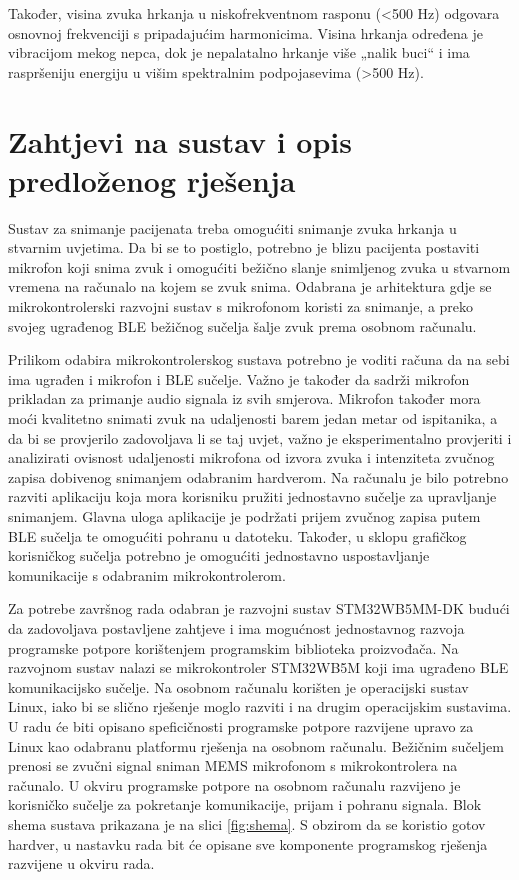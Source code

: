 Također, visina zvuka hrkanja u niskofrekventnom rasponu (<500 Hz) odgovara osnovnoj frekvenciji s pripadajućim harmonicima. Visina hrkanja određena je vibracijom mekog nepca, dok je nepalatalno hrkanje više „nalik buci“ i ima raspršeniju energiju u višim spektralnim podpojasevima (>500 Hz).


\section{Zahtjevi na sustav i opis predloženog rješenja}

Sustav za snimanje pacijenata treba omogućiti snimanje zvuka hrkanja u stvarnim uvjetima. Da bi se to postiglo, potrebno je blizu pacijenta postaviti mikrofon koji snima zvuk i omogućiti bežično slanje snimljenog zvuka u stvarnom vremena na računalo na kojem se zvuk snima. Odabrana je arhitektura gdje se mikrokontrolerski razvojni sustav s mikrofonom koristi za snimanje, a preko svojeg ugrađenog BLE bežičnog sučelja šalje zvuk prema osobnom računalu. 

Prilikom odabira mikrokontrolerskog sustava potrebno je voditi računa da na sebi ima ugrađen i mikrofon i BLE sučelje. Važno je također da sadrži mikrofon prikladan za primanje audio signala iz svih smjerova. Mikrofon također mora moći kvalitetno snimati  zvuk na udaljenosti barem jedan metar od ispitanika, a da bi se provjerilo zadovoljava li se taj uvjet, važno je eksperimentalno provjeriti i analizirati ovisnost udaljenosti mikrofona od izvora zvuka i intenziteta zvučnog zapisa dobivenog snimanjem odabranim hardverom. Na računalu je bilo potrebno razviti aplikaciju koja mora korisniku pružiti jednostavno sučelje za upravljanje snimanjem. Glavna uloga aplikacije je podržati prijem zvučnog zapisa putem BLE sučelja te omogućiti pohranu u datoteku. Također, u sklopu grafičkog korisničkog sučelja potrebno je omogućiti jednostavno uspostavljanje komunikacije s odabranim mikrokontrolerom.

Za potrebe završnog rada odabran je razvojni sustav STM32WB5MM-DK budući da zadovoljava postavljene zahtjeve i ima mogućnost jednostavnog razvoja programske potpore  korištenjem programskim biblioteka proizvođača. Na razvojnom sustav nalazi se mikrokontroler STM32WB5M koji ima ugrađeno BLE komunikacijsko sučelje. Na osobnom računalu korišten je operacijski sustav Linux, iako bi se slično rješenje moglo razviti i na drugim operacijskim sustavima. U radu će biti opisano speficičnosti programske potpore razvijene upravo za Linux kao odabranu platformu rješenja na osobnom računalu. Bežičnim sučeljem prenosi se zvučni signal sniman MEMS mikrofonom s mikrokontrolera na računalo. U okviru programske potpore na osobnom računalu razvijeno je korisničko sučelje za pokretanje komunikacije, prijam i pohranu signala. Blok shema sustava prikazana je na slici \ref{fig:shema}. S obzirom da se koristio gotov hardver, u nastavku rada bit će opisane sve komponente programskog rješenja razvijene u okviru rada.

